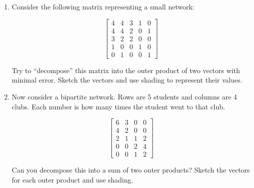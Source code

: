 \documentclass[a4paper, 14pt]{extarticle}
\begin{document}
\begin{enumerate}[resume]
    \item Consider the following matrix representing a small network:

    \[
    \begin{bmatrix}
    4 & 4 & 3 & 1 & 0 \\
    4 & 4 & 2 & 0 & 1 \\
    3 & 2 & 2 & 0 & 0 \\
    1 & 0 & 0 & 1 & 0 \\
    0 & 1 & 0 & 0 & 1
    \end{bmatrix}
    \]

    Try to ``decompose'' this matrix into the outer product of two vectors with minimal error. Sketch the vectors and use shading to represent their values.
    \vspace{3cm}
    \item Now consider a bipartite network. Rows are 5 students and columns are 4 clubs. Each number is how many times the student went to that club.

    \[
    \begin{bmatrix}
    6 & 3 & 0 & 0 \\
    4 & 2 & 0 & 0 \\
    2 & 1 & 1 & 2 \\
    0 & 0 & 2 & 4 \\
    0 & 0 & 1 & 2
    \end{bmatrix}
    \]

    Can you decompose this into a sum of two outer products? Sketch the vectors for each outer product and use shading.
    \vspace{3cm}
\end{enumerate}
\end{document}
